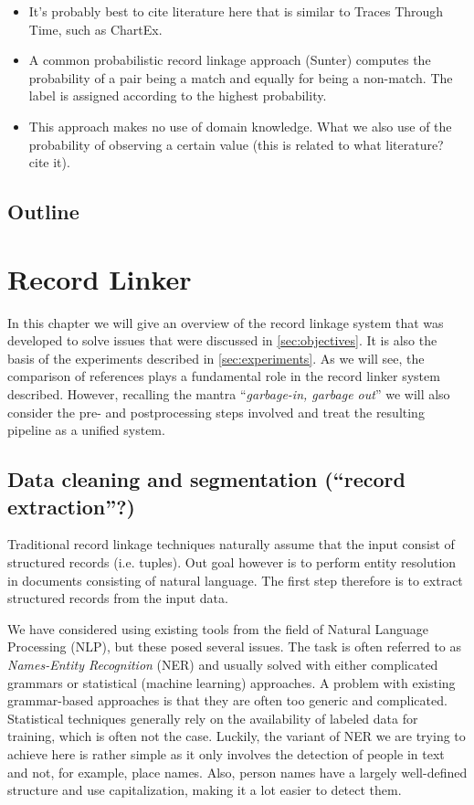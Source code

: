 \documentclass[paper=a4, fontsize=11pt]{scrartcl}
\begin{document}
\begin{itemize}
    \item It's probably best to cite literature here that is similar to Traces Through Time, such as ChartEx.
    \item A common probabilistic record linkage approach (Sunter) computes the probability of a pair being a match and equally for being a non-match. The label is assigned according to the highest probability.
    \item This approach makes no use of domain knowledge. What we also use of the probability of observing a certain value (this is related to what literature? cite it).
\end{itemize}

\subsection{Outline}
\label{sec:outline}



\section{Record Linker}
\label{sec:record_linker}
In this chapter we will give an overview of the record linkage system that was developed to solve issues that were discussed in \cref{sec:objectives}. It is also the basis of the experiments described in \cref{sec:experiments}.
As we will see, the comparison of references plays a fundamental role in the record linker system described.
However, recalling the mantra ``\emph{garbage-in, garbage out}'' we will also consider the pre- and postprocessing steps involved and treat the resulting pipeline as a unified system.

\subsection{Data cleaning and segmentation (``record extraction''?)}
\label{sec:segmentation}
Traditional record linkage techniques naturally assume that the input consist of structured records (i.e. tuples).
Out goal however is to perform entity resolution in documents consisting of natural language.
The first step therefore is to extract structured records from the input data.

We have considered using existing tools from the field of Natural Language Processing (NLP), but these posed several issues.
The task is often referred to as \emph{Names-Entity Recognition} (NER) and usually solved with either complicated grammars or statistical (machine learning) approaches.
A problem with existing grammar-based approaches is that they are often too generic and complicated.
Statistical techniques generally rely on the availability of labeled data for training, which is often not the case.
Luckily, the variant of NER we are trying to achieve here is rather simple as it only involves the detection of people in text and not, for example, place names.
Also, person names have a largely well-defined structure and use capitalization, making it a lot easier to detect them.
\end{document}
